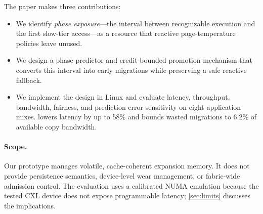 The paper makes three contributions:

\begin{itemize}
  \item We identify \emph{phase exposure}---the interval between recognizable
        execution and the first slow-tier access---as a resource that reactive
        page-temperature policies leave unused.
  \item We design a phase predictor and credit-bounded promotion mechanism that
        converts this interval into early migrations while preserving a safe
        reactive fallback.
  \item We implement the design in Linux and evaluate latency, throughput,
        bandwidth, fairness, and prediction-error sensitivity on eight
        application mixes.  \system lowers \ptail latency by up to 58\% and bounds
        wasted migrations to 6.2\% of available copy bandwidth.
\end{itemize}

\paragraph{Scope.}
Our prototype manages volatile, cache-coherent expansion memory.  It does not
provide persistence semantics, device-level wear management, or fabric-wide
admission control.  The evaluation uses a calibrated NUMA emulation because
the tested CXL device does not expose programmable latency; \cref{sec:limits}
discusses the implications.
